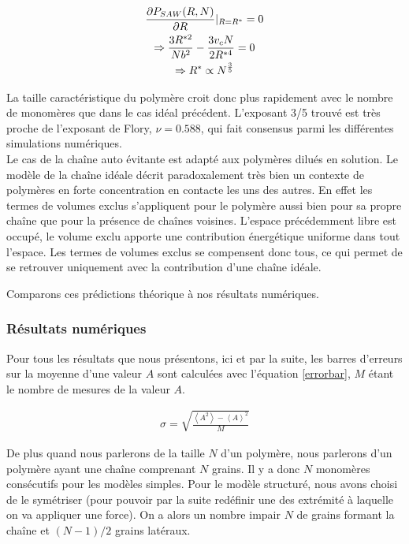 \begin{gather}
\frac{\partial P_{SAW}(R,N)}{\partial R} \Huge{|} _{R=R^*}=0 \nonumber\\
\Rightarrow \frac{3R^{*2}}{Nb^2}-\frac{3v_cN}{2R^{*4}} =0 \\
\Rightarrow R^* \propto N^\frac{3}{5}\nonumber
\end{gather}


La taille caractéristique du polymère croit donc plus rapidement avec le nombre de monomères que dans le cas idéal précédent. L'exposant 3/5 trouvé est très proche de l'exposant de Flory, $\nu=0.588$, qui fait consensus parmi les différentes simulations numériques. \\


Le cas de la chaîne auto évitante est adapté aux polymères dilués en solution. Le modèle de la chaîne idéale décrit paradoxalement très bien un contexte de polymères en forte concentration en contacte les uns des autres. En effet les termes de volumes exclus s'appliquent pour le polymère aussi bien pour sa propre chaîne que pour la présence de chaînes voisines. L'espace précédemment libre est occupé, le volume exclu apporte une contribution énergétique uniforme dans tout l'espace. Les termes de volumes exclus se compensent donc tous, ce qui permet de se retrouver uniquement avec la contribution d'une chaîne idéale.

Comparons ces prédictions théorique à nos résultats numériques.

\subsubsection{Résultats numériques}
Pour tous les résultats que nous présentons, ici et par la suite, les barres d'erreurs sur la moyenne d'une valeur $A$ sont calculées avec l'équation \ref{errorbar}, $M$ étant le nombre de mesures de la valeur $A$.

\begin{eqnarray}
\sigma=\sqrt{\frac{\left<A^2\right>-\left<A\right>^2}{M}}
\label{errorbar}
\end{eqnarray}

De plus quand nous parlerons de la taille $N$ d'un polymère, nous parlerons d'un polymère ayant une chaîne comprenant $N$ grains. Il y a donc $N$ monomères consécutifs pour les modèles simples. Pour le modèle structuré, nous avons choisi de le symétriser (pour pouvoir par la suite redéfinir une des extrémité à laquelle on va appliquer une force). On a alors un nombre impair $N$ de grains formant la chaîne et $(N-1)/2$ grains latéraux.\\


